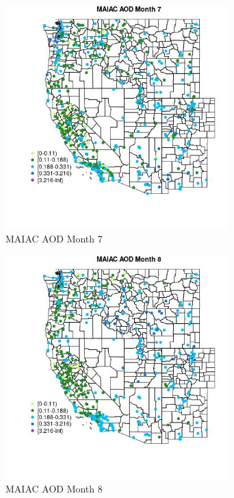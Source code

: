 \begin{figure} 
\centering  
\includegraphics[width=0.77\textwidth]{Code_Outputs/Report_ML_input_PM25_Step4_part_e_de_duplicated_aves_compiled_2019-05-14wNAs_MapObsMo7MAIAC_AOD.jpg} 
\caption{\label{fig:Report_ML_input_PM25_Step4_part_e_de_duplicated_aves_compiled_2019-05-14wNAsMapObsMo7MAIAC_AOD}MAIAC AOD Month 7} 
\end{figure} 
 

\begin{figure} 
\centering  
\includegraphics[width=0.77\textwidth]{Code_Outputs/Report_ML_input_PM25_Step4_part_e_de_duplicated_aves_compiled_2019-05-14wNAs_MapObsMo8MAIAC_AOD.jpg} 
\caption{\label{fig:Report_ML_input_PM25_Step4_part_e_de_duplicated_aves_compiled_2019-05-14wNAsMapObsMo8MAIAC_AOD}MAIAC AOD Month 8} 
\end{figure} 
 

